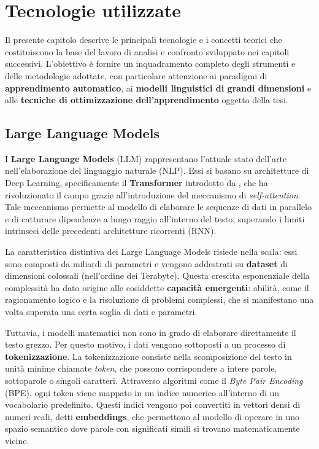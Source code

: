 
\chapter{Tecnologie utilizzate}
\label{cap:2}
Il presente capitolo descrive le principali tecnologie e i concetti teorici che costituiscono la base del lavoro di analisi e confronto sviluppato nei capitoli successivi. L’obiettivo è fornire un inquadramento completo degli strumenti e delle metodologie adottate, con particolare attenzione ai paradigmi di \textbf{apprendimento automatico}, ai \textbf{modelli linguistici di grandi dimensioni} e alle \textbf{tecniche di ottimizzazione dell’apprendimento} oggetto della tesi.


\section{Large Language Models}
I \textbf{Large Language Models} (LLM) rappresentano l'attuale stato dell'arte nell'elaborazione del linguaggio naturale (NLP). Essi si basano su architetture di Deep Learning, specificamente il \textbf{Transformer} introdotto da \citet{vaswani2017attention}, che ha rivoluzionato il campo grazie all'introduzione del meccanismo di \textit{self-attention}. Tale meccanismo permette al modello di elaborare le sequenze di dati in parallelo e di catturare dipendenze a lungo raggio all'interno del testo, superando i limiti intrinseci delle precedenti architetture ricorrenti (RNN).

La caratteristica distintiva dei Large Language Models risiede nella scala: essi sono composti da miliardi di parametri e vengono addestrati su \textbf{dataset} di dimensioni colossali (nell'ordine dei Terabyte). Questa crescita esponenziale della complessità ha dato origine alle cosiddette \textbf{capacità emergenti}: abilità, come il ragionamento logico e la risoluzione di problemi complessi, che si manifestano una volta superata una certa soglia di dati e parametri.

Tuttavia, i modelli matematici non sono in grado di elaborare direttamente il testo grezzo. Per questo motivo, i dati vengono sottoposti a un processo di \textbf{tokenizzazione}. La tokenizzazione consiste nella scomposizione del testo in unità minime chiamate \textit{token}, che possono corrispondere a intere parole, sottoparole o singoli caratteri. Attraverso algoritmi come il \textit{Byte Pair Encoding} (BPE), ogni token viene mappato in un indice numerico all'interno di un vocabolario predefinito. Questi indici vengono poi convertiti in vettori densi di numeri reali, detti \textbf{embeddings}, che permettono al modello di operare in uno spazio semantico dove parole con significati simili si trovano matematicamente vicine.

